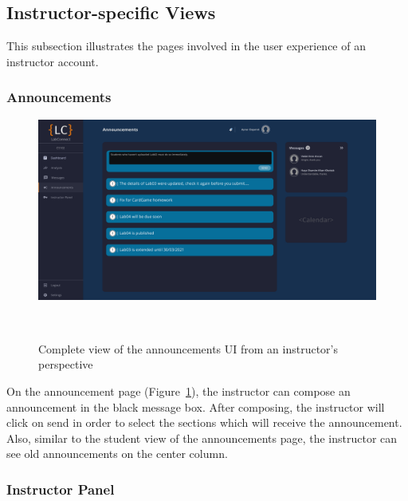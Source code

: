 \documentclass[a4paper, 12pt]{article}
\begin{document}
    \pagebreak


    \subsection{Instructor-specific Views}

    This subsection illustrates the pages involved in the user experience of an instructor account.

    \subsubsection{Announcements}

    \begin{figure}[H]
        \centering
        \includegraphics[width=\textwidth]{instructor_announcements}
        \caption{Complete view of the announcements UI from an instructor's perspective}~\label{fig:instructor_announcements_full}
    \end{figure}

    On the announcement page (Figure~\ref{fig:instructor_announcements_full}), the instructor can compose an announcement in the black message box. After composing, the instructor will click on send
    in order to select the sections which will receive the announcement. Also, similar to the student view of the announcements page, the instructor can see old announcements on the center column.



    \pagebreak

    \subsubsection{Instructor Panel}
\end{document}

